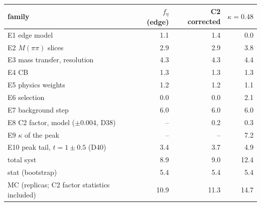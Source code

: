 \begin{tabular}{lrrr}
\hline
 family & $f_\eta$(edge) & C2 corrected & $\kappa=0.48$ \\
\hline
 E1 edge model & 1.1 & 1.4 & 0.0 \\
 E2 $M(\pi\pi)$ slices & 2.9 & 2.9 & 3.8 \\
 E3 mass transfer, resolution & 4.3 & 4.3 & 4.4 \\
 E4 CB & 1.3 & 1.3 & 1.3 \\
 E5 physics weights & 1.2 & 1.2 & 1.1 \\
 E6 selection & 0.0 & 0.0 & 2.1 \\
 E7 background step & 6.0 & 6.0 & 6.0 \\
 E8 C2 factor, model ($\pm0.004$, D38) & -- & 0.2 & 0.3 \\
 E9 $\kappa$ of the peak & -- & -- & 7.2 \\
 E10 peak tail, $t=1\pm0.5$ (D40) & 3.4 & 3.7 & 4.9 \\
\hline
 total syst & 8.9 & 9.0 & 12.4 \\
 stat (bootstrap) & 5.4 & 5.4 & 5.4 \\
 MC (replicas; C2 factor statistics included) & 10.9 & 11.3 & 14.7 \\
\hline
\end{tabular}
